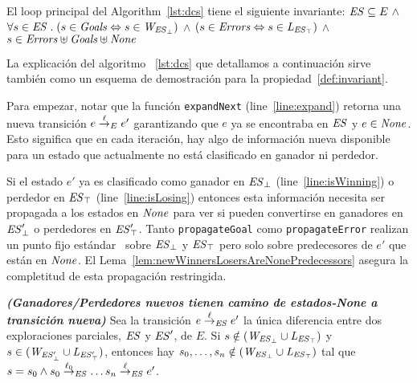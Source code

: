 \begin{property}[Invariante]
\label{def:invariant}
El loop principal del Algorithm~\ref{lst:dcs} tiene el siguiente invariante: 
$\mathit{ES} \subseteq E \ \wedge $ $\forall s \in \mathit{ES} \;.\; (s\in\mathit{Goals} 
\Leftrightarrow 
s \in 
\mathit{W_{\mathit{\mathit{ES}_{\bot}}}})$ $\wedge$  $(s\in\mathit{Errors} 
\Leftrightarrow s \in \mathit{L_{\mathit{\mathit{ES}_{\top}}}})$ $\wedge$  
$s\in\mathit{Errors}\uplus\mathit{Goals}\uplus\mathit{None}$

\end{property}

La explicación del algoritmo ~\ref{lst:dcs} que detallamos a continuación sirve también como un esquema de demostración para la propiedad~\ref{def:invariant}.   

Para empezar, notar que la función \texttt{expandNext} 
(line~\ref{line:expand}) retorna una nueva transición $e \overset{\ell}{\rightarrow}_{E} e'$ 
garantizando que $e$ ya se encontraba en $\mathit{ES}$ y $e \in \mathit{None}$. 
Esto significa que en cada iteración, hay algo de información nueva disponible para un estado que actualmente no está clasificado en ganador ni perdedor.

Si el estado $e'$ ya es clasificado como ganador en
$\mathit{\mathit{ES}_{\bot}}$ (line~\ref{line:isWinning}) o
perdedor en $\mathit{\mathit{ES}_{\top}}$ (line~\ref{line:isLosing}) 
entonces esta información necesita ser propagada a los estados en $\mathit{None}$ para ver si pueden convertirse en ganadores en 
$\mathit{\mathit{ES}'_{\bot}}$ o perdedores en
$\mathit{\mathit{ES}'_{\top}}$. Tanto \texttt{propagateGoal} como
\texttt{propagateError} realizan un punto fijo estándar~\cite{Ramadge:1989:CDES} sobre
$\mathit{\mathit{ES}_{\bot}}$ y
$\mathit{\mathit{ES}_{\top}}$ pero solo sobre predecesores de $e'$ que están en $\mathit{None}$. 
El Lema~\ref{lem:newWinnersLosersAreNonePredecessors} asegura la completitud de esta propagación restringida.

\begin{lemma}\textbf{\emph{(Ganadores/Perdedores nuevos tienen camino de estados-\textit{None} a transición nueva)}}
\label{lem:newWinnersLosersAreNonePredecessors}
Sea la transición $e \overset{\ell}{\rightarrow}_{\mathit{ES}} e'$ la única diferencia entre dos exploraciones parciales, $\mathit{ES}$ y $\mathit{ES}'$, de $E$. Si $s \notin (\mathit{W_{\mathit{\mathit{ES}_{\bot}}}} \cup \mathit{L_{\mathit{\mathit{ES}_{\top}}}})$ y $s \in (\mathit{W_{\mathit{\mathit{ES}'_{\bot}}}} \cup \mathit{L_{\mathit{\mathit{ES}'_{\top}}}})$, entonces hay $s_0, \ldots, s_n \notin (\mathit{W_{\mathit{\mathit{ES}_{\bot}}}} \cup \mathit{L_{\mathit{\mathit{ES}_{\top}}}})$ tal que $s = s_0 \wedge
s_0 \overset{\ell_0}{\rightarrow}_{\mathit{ES}}\ldots s_{n} \overset{\ell}{\rightarrow}_{\mathit{ES}} e'$.
\end{lemma}

